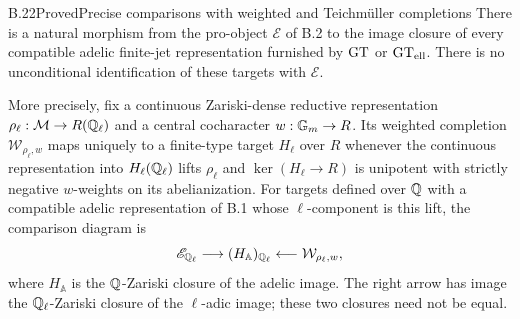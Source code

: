 \begin{statement}{B.22}{Proved}{Precise comparisons with weighted and Teichm\"uller completions}
There is a natural morphism from the pro-object $\mathscr E$ of B.2
to the image closure of every compatible adelic finite-jet
representation furnished by $\mathrm{GT}$ or $\mathrm{GT}_{\rm ell}$. There is no
unconditional identification of these targets with $\mathscr E$.

More precisely, fix a continuous Zariski-dense reductive representation
$\rho_\ell:\mathcal M\to R(\mathbb Q_\ell)$ and a central cocharacter
$w:\mathbb G_m\to R$. Its weighted completion
$\mathcal W_{\rho_\ell,w}$ maps uniquely to a finite-type target
$H_\ell$ over $R$ whenever the continuous representation into $H_\ell(\mathbb Q_\ell)$
lifts $\rho_\ell$ and $\ker(H_\ell\to R)$ is unipotent with
strictly negative $w$-weights on its abelianization. For targets
defined over $\mathbb Q$ with a compatible adelic representation of B.1
whose $\ell$-component is this lift,
the comparison diagram is
\[
 \mathscr E_{\mathbb Q_\ell}\longrightarrow (H_{\mathbb A})_{\mathbb Q_\ell}
 \longleftarrow\mathcal W_{\rho_\ell,w},
\]
where $H_{\mathbb A}$ is the $\mathbb Q$-Zariski closure of the adelic
image. The right arrow has image the $\mathbb Q_\ell$-Zariski closure of
the $\ell$-adic image; these two closures need not be equal.
\end{statement}
